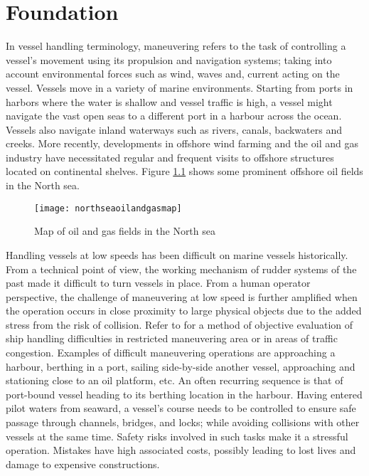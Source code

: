 \chapter{Foundation}

In vessel handling terminology, maneuvering refers to the task of controlling a vessel’s movement using its propulsion and navigation systems; taking into account environmental forces such as wind, waves and, current acting on the vessel. Vessels move in a variety of marine environments. Starting from ports in harbors where the water is shallow and vessel traffic is high, a vessel might navigate the vast open seas to a different port in a harbour across the ocean. Vessels also navigate inland waterways such as rivers, canals, backwaters and creeks. More recently, developments in offshore wind farming and the oil and gas industry have necessitated regular and frequent visits to offshore structures located on continental shelves. Figure \ref{fig:northseamap} shows some prominent offshore oil fields in the North sea. 

\begin{figure}
	\centering
	\texttt{[image: northseaoilandgasmap]}
	\caption{Map of oil and gas fields in the North sea}
	\label{fig:northseamap}
\end{figure}





Handling vessels at low speeds has been difficult on marine vessels historically. From a technical point of view, the working mechanism of rudder systems of the past made it difficult to turn vessels in place. From a human operator perspective, the challenge of maneuvering at low speed is further amplified when the operation occurs in close proximity to large physical objects due to the added stress from the risk of collision. Refer to \cite{inoue2000evaluation} for a method of objective evaluation of ship handling difficulties in restricted maneuvering area or in areas of traffic congestion. Examples of difficult maneuvering operations are approaching a harbour, berthing in a port, sailing side-by-side another vessel, approaching and stationing close to an oil platform, etc. An often recurring sequence is that of  port-bound vessel heading to its berthing location in the harbour. Having entered pilot waters from seaward, a vessel's course needs to be controlled to ensure safe passage through channels, bridges, and locks; while avoiding collisions with other vessels at the same time. Safety risks involved in such tasks make it a stressful operation. Mistakes have high associated costs, possibly leading to lost lives and damage to expensive constructions.


